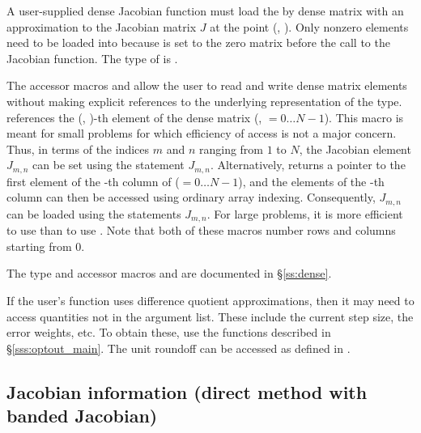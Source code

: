{
  A user-supplied dense Jacobian function must load the  by 
  dense matrix  with an approximation to the Jacobian matrix $J$
  at the point (, ).  Only nonzero elements need to be loaded
  into  because  is set to the zero matrix before the call
  to the Jacobian function. The type of  is . 
  
  The accessor macros  and  allow the user to
  read and write dense matrix elements without making explicit
  references to the underlying representation of the 
  type.  references the (, )-th
  element of the dense matrix  (, $= 0\ldots N-1$). This macro
  is meant for small problems for which efficiency of access is not a major
  concern.  Thus, in terms of the indices $m$ and $n$ ranging from $1$ to
  $N$, the Jacobian element $J_{m,n}$ can be set using the statement
   $J_{m,n}$.  Alternatively,
   returns a pointer to the first element of
  the -th column of  ($= 0\ldots N-1$), and the 
  elements of the -th column
  can then be accessed using ordinary array indexing.  Consequently, $J_{m,n}$ can be 
  loaded using the statements 
   $J_{m,n}$.  For large problems, it is more 
  efficient to use  than to use . 
  Note that both of these macros number rows and columns
  starting from $0$.  

  The  type and accessor macros  and 
   are documented in \S\ref{ss:dense}.

  If the user's  function uses difference quotient
  approximations, then it may need to access quantities not in the argument
  list. These include the current step size, the error weights, etc.
  To obtain these, use the  functions described in
  \S\ref{sss:optout_main}. The unit roundoff can be accessed
  as  defined in .
}

\subsection{Jacobian information (direct method with banded Jacobian)}
\label{ss:bjacFn}

